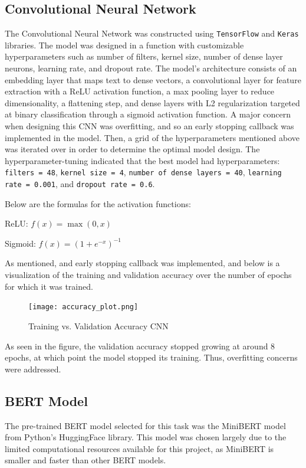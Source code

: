 \documentclass[twocolumn]{article}
\begin{document}
\subsection{Convolutional Neural Network}
The Convolutional Neural Network was constructed using \texttt{TensorFlow} and \texttt{Keras} libraries. The model was designed in a function with customizable hyperparameters such as number of filters, kernel size, number of dense layer neurons, learning rate, and dropout rate. The model's architecture consists of an embedding layer that maps text to dense vectors, a convolutional layer for feature extraction with a ReLU activation function, a max pooling layer to reduce dimensionality, a flattening step, and dense layers with L2 regularization targeted at binary classification through a sigmoid activation function. A major concern when designing this CNN was overfitting, and so an early stopping callback was implemented in the model. Then, a grid of the hyperparameters mentioned above was iterated over in order to determine the optimal model design. The hyperparameter-tuning indicated that the best model had hyperparameters: \texttt{filters = 48}, \texttt{kernel size = 4}, \texttt{number of dense layers = 40}, \texttt{learning rate = 0.001}, and \texttt{dropout rate = 0.6}.

Below are the formulas for the activation functions:

\begin{center}
ReLU: \(f(x) = \max(0, x)\)
\end{center}

\begin{center}
Sigmoid: \( f(x) = (1 + e^{-x})^{-1} \)
\end{center}

As mentioned, and early stopping callback was implemented, and below is a visualization of the training and validation accuracy over the number of epochs for which it was trained.

\begin{figure}[H]
    \centering
    \texttt{[image: accuracy\_plot.png]}
    \caption{Training vs. Validation Accuracy CNN}
\end{figure}

As seen in the figure, the validation accuracy stopped growing at around 8 epochs, at which point the model stopped its training. Thus, overfitting concerns were addressed.

\subsection{BERT Model}
The pre-trained BERT model selected for this task was the MiniBERT model from Python's HuggingFace library. This model was chosen largely due to the limited computational resources available for this project, as MiniBERT is smaller and faster than other BERT models. 
\end{document}

